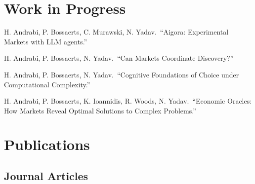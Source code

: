 \documentclass[11pt,letterpaper]{report}
\newcommand{\listitemspace}{0.25em}
\renewenvironment{itemize}
{\begin{list}{}{\setlength{\leftmargin}{0em}
                \setlength{\parskip}{0em}
                \setlength{\itemsep}{\listitemspace}
                \setlength{\parsep}{\listitemspace}}}
{\end{list}}
\begin{document}
    \section*{Work in Progress}

    \begin{itemize}
        \item H. Andrabi, P. Bossaerts, C. Murawski, N. Yadav.\ \enquote{Aigora: Experimental Markets with LLM agents.}
        \item H. Andrabi, P. Bossaerts, N. Yadav.\ \enquote{Can Markets Coordinate Discovery?}
        \item H. Andrabi, P. Bossaerts, N. Yadav.\ \enquote{Cognitive Foundations of Choice under Computational Complexity.}
        \item H. Andrabi, P. Bossaerts, K. Ioannidis, R. Woods, N. Yadav.\ \enquote{Economic Oracles: How Markets Reveal Optimal Solutions to Complex Problems.}
    \end{itemize}

    \section*{Publications}

    \subsection*{Journal Articles}
\end{document}
